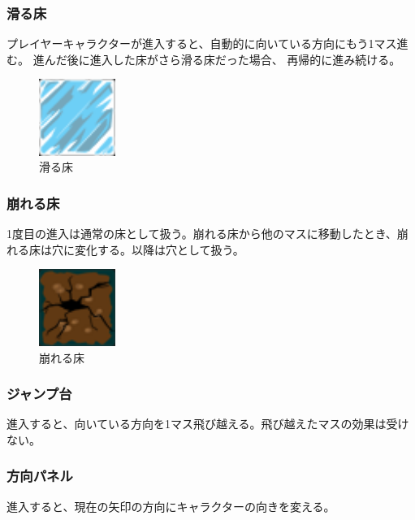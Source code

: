 \subsubsection{滑る床}
プレイヤーキャラクターが進入すると、自動的に向いている方向にもう1マス進む。
進んだ後に進入した床がさら滑る床だった場合、
再帰的に進み続ける。

\begin{figure}[htbp]
  \begin{center}
    \includegraphics[bb=0 0 24 24, width=2.5cm]{images/ice.png}
  \end{center}
  \caption{滑る床}
  \label{fig:one}
\end{figure}

\subsubsection{崩れる床}
1度目の進入は通常の床として扱う。崩れる床から他のマスに移動したとき、崩れる床は穴に変化する。以降は穴として扱う。

\begin{figure}[htbp]
  \begin{center}
    \includegraphics[bb=0 0 24 24, width=2.5cm]{images/broken.png}
  \end{center}
  \caption{崩れる床}
  \label{fig:one}
\end{figure}

\subsubsection{ジャンプ台}
進入すると、向いている方向を1マス飛び越える。飛び越えたマスの効果は受けない。

\subsubsection{方向パネル}
進入すると、現在の矢印の方向にキャラクターの向きを変える。


